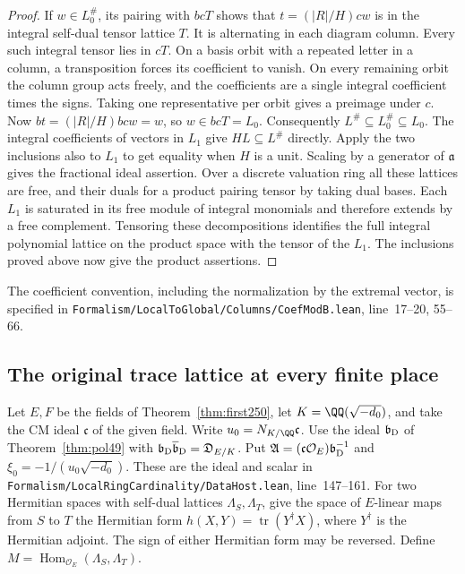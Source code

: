 \documentclass[a4paper,11pt]{article}
\theoremstyle{definition}
\theoremstyle{remark}
\newcommand{\srcloc}[2]{{\small\nolinkurl{#1.lean}}, line~#2}
\numberwithin{equation}{section}
\begin{document}
\begin{proof}
If \(w\in L_0^\#\), its pairing with \(bcT\) shows that
\(t=(|R|/H)cw\) is in the integral self-dual tensor
lattice \(T\). It is alternating in each diagram column.
Every such integral tensor lies in \(cT\). On a basis
orbit with a repeated letter in a column, a transposition
forces its coefficient to vanish. On every remaining
orbit the column group acts freely, and the coefficients
are a single integral coefficient times the signs. Taking
one representative per orbit gives a preimage under \(c\).
Now \(bt=(|R|/H)bcw=w\), so \(w\in bcT=L_0\).
Consequently \(L^\#\subseteq L_0^\#\subseteq L_0\).
The integral coefficients of vectors in \(L_1\) give
\(H L\subseteq L^\#\) directly. Apply the two inclusions
also to \(L_1\) to get equality when \(H\) is a unit.
Scaling by a generator of \(\mathfrak a\) gives the
fractional ideal assertion. Over a discrete valuation
ring all these lattices are free, and their duals for a
product pairing tensor by taking dual bases. Each \(L_1\)
is saturated in its free module of integral monomials and
therefore extends by a free complement. Tensoring these
decompositions identifies the full integral polynomial
lattice on the product space with the tensor of the \(L_1\).
The inclusions proved above now give the product assertions.
\end{proof}

The coefficient convention, including the normalization by
the extremal vector, is specified in
\srcloc{Formalism/LocalToGlobal/Columns/CoefModB}{17--20, 55--66}.

\subsection{The original trace lattice at every finite place}\label{nav:VI-59}
Let \(E,F\) be the fields of Theorem~\ref{thm:first250}, let
\(K=\QQ(\sqrt{-d_0})\), and take the CM ideal \(\mathfrak c\)
of the given field. Write \(u_0=N_{K/\QQ}\mathfrak c\).
Use the ideal \(\mathfrak b_{\rm D}\) of Theorem~\ref{thm:pol49}
with \(\mathfrak b_{\rm D}\overline{\mathfrak b}_{\rm D}
=\mathfrak D_{E/K}\). Put
\(\mathfrak A=(\mathfrak c\mathcal O_E)\mathfrak b_{\rm D}^{-1}\)
and \(\xi_0=-1/(u_0\sqrt{-d_0})\). These are the ideal and scalar
in \srcloc{Formalism/LocalRingCardinality/DataHost}{147--161}.
For two Hermitian spaces with self-dual lattices
\(\Lambda_S,\Lambda_T\), give the space of \(E\)-linear maps
from \(S\) to \(T\) the Hermitian form
\(h(X,Y)=\operatorname{tr}(Y^\dagger X)\), where \(Y^\dagger\)
is the Hermitian adjoint. The sign of either Hermitian form may
be reversed. Define \(M=\operatorname{Hom}_{\mathcal O_E}
(\Lambda_S,\Lambda_T)\).
\end{document}
